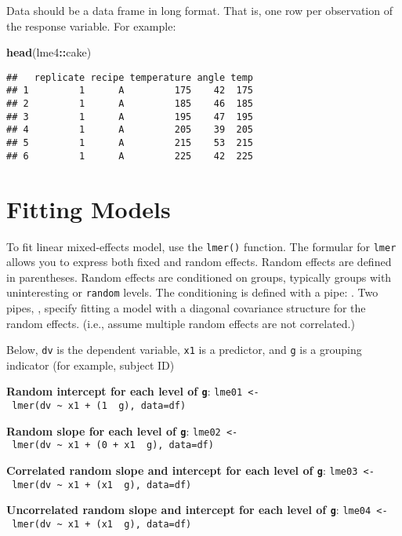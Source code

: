 \documentclass[
]{article}
\newenvironment{Shaded}{\begin{snugshade}}{\end{snugshade}}
\newcommand{\FunctionTok}[1]{\textcolor[rgb]{0.13,0.29,0.53}{\textbf{#1}}}
\newcommand{\NormalTok}[1]{#1}
\newcommand{\SpecialCharTok}[1]{\textcolor[rgb]{0.81,0.36,0.00}{\textbf{#1}}}
\begin{document}
Data should be a data frame in long format. That is, one row per
observation of the response variable. For example:

\begin{Shaded}
\begin{Highlighting}[]
\FunctionTok{head}\NormalTok{(lme4}\SpecialCharTok{::}\NormalTok{cake)}
\end{Highlighting}
\end{Shaded}

\begin{verbatim}
##   replicate recipe temperature angle temp
## 1         1      A         175    42  175
## 2         1      A         185    46  185
## 3         1      A         195    47  195
## 4         1      A         205    39  205
## 5         1      A         215    53  215
## 6         1      A         225    42  225
\end{verbatim}

\section{Fitting Models}\label{fitting-models}

To fit linear mixed-effects model, use the \texttt{lmer()} function. The
formular for \texttt{lmer} allows you to express both fixed and random
effects. Random effects are defined in parentheses. Random effects are
conditioned on groups, typically groups with uninteresting or
\texttt{random} levels. The conditioning is defined with a pipe:
\texttt{\textbar{}}. Two pipes, \texttt{\textbar{}\textbar{}}, specify
fitting a model with a diagonal covariance structure for the random
effects. (i.e., assume multiple random effects are not correlated.)

Below, \texttt{dv} is the dependent variable, \texttt{x1} is a
predictor, and \texttt{g} is a grouping indicator (for example, subject
ID)

\textbf{Random intercept for each level of \texttt{g}}:
\texttt{lme01\ \textless{}-\ lmer(dv\ \textasciitilde{}\ x1\ +\ (1\ \textbar{}\ g),\ data=df)}

\textbf{Random slope for each level of \texttt{g}}:
\texttt{lme02\ \textless{}-\ lmer(dv\ \textasciitilde{}\ x1\ +\ (0\ +\ x1\ \textbar{}\ g),\ data=df)}

\textbf{Correlated random slope and intercept for each level of
\texttt{g}}:
\texttt{lme03\ \textless{}-\ lmer(dv\ \textasciitilde{}\ x1\ +\ (x1\ \textbar{}\ g),\ data=df)}

\textbf{Uncorrelated random slope and intercept for each level of
\texttt{g}}:
\texttt{lme04\ \textless{}-\ lmer(dv\ \textasciitilde{}\ x1\ +\ (x1\ \textbar{}\textbar{}\ g),\ data=df)}
\end{document}
